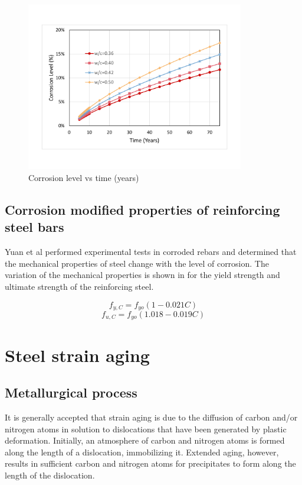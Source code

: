 \begin{figure}[htbp]
\centering
\includegraphics[width=0.85\textwidth]{Chapter-2/figs/CorrosionLevel}
\caption{Corrosion level vs time (years)}
\label{fig:CorrosionLevel_Time}
\end{figure}

\subsection{Corrosion modified properties of reinforcing steel bars}

Yuan et al \cite{Yuan2017a} performed experimental tests in corroded rebars and determined that the mechanical properties of steel change with the level of corrosion. The variation of the mechanical properties is shown in  for the yield strength and ultimate strength of the reinforcing steel.

\begin{equation}
  f_{y,C}=f_{yo}(1-0.021C)
  \label{eq.eleven}
\end{equation} 
\[
  f_{u,C}=f_{yo}(1.018-0.019C)
\]

\section{Steel strain aging}

\subsection{Metallurgical process}

It is generally accepted that strain aging is due to the diffusion of carbon and/or nitrogen atoms in solution to dislocations that have been generated by plastic deformation. Initially, an atmosphere of carbon and nitrogen atoms is formed along the length of a dislocation, immobilizing it. Extended aging, however, results in sufficient carbon and nitrogen atoms for precipitates to form along the length of the dislocation\cite{Overby2017}\cite{Hosseini2015}.

